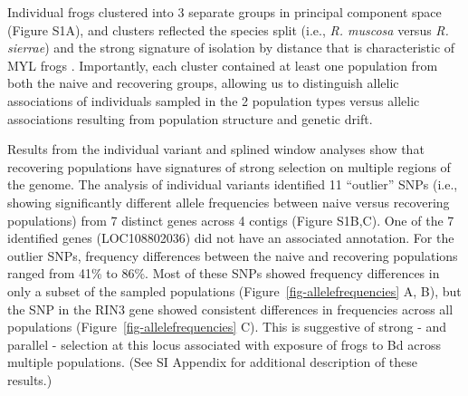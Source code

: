 \documentclass[9pt,twocolumn,twoside,lineno]{pnas-new}
\begin{document}
Individual frogs clustered into 3 separate groups in principal component
space (Figure S1A), and clusters reflected the
species split (i.e., \emph{R. muscosa} versus \emph{R. sierrae}) and the
strong signature of isolation by distance that is characteristic of MYL
frogs \citep{rothstein2020, poorten2017}. Importantly, each cluster
contained at least one population from both the naive and recovering
groups, allowing us to distinguish allelic associations of individuals
sampled in the 2 population types versus allelic associations resulting
from population structure and genetic drift.

Results from the individual variant and splined window analyses show
that recovering populations have signatures of strong selection on
multiple regions of the genome. The analysis of individual variants
identified 11 ``outlier'' SNPs (i.e., showing significantly different
allele frequencies between naive versus recovering populations) from 7
distinct genes across 4 contigs (Figure S1B,C). One of the 7 identified genes (LOC108802036) did not have an
associated annotation. For the outlier SNPs, frequency differences
between the naive and recovering populations ranged from 41\% to 86\%.
Most of these SNPs showed frequency differences in only a subset of the
sampled populations (Figure~\ref{fig-allelefrequencies} A, B), but the
SNP in the RIN3 gene showed consistent differences in frequencies across
all populations (Figure~\ref{fig-allelefrequencies} C). This is
suggestive of strong - and parallel - selection at this locus associated
with exposure of frogs to Bd across multiple populations. (See SI
Appendix for additional description of these results.)
\end{document}
